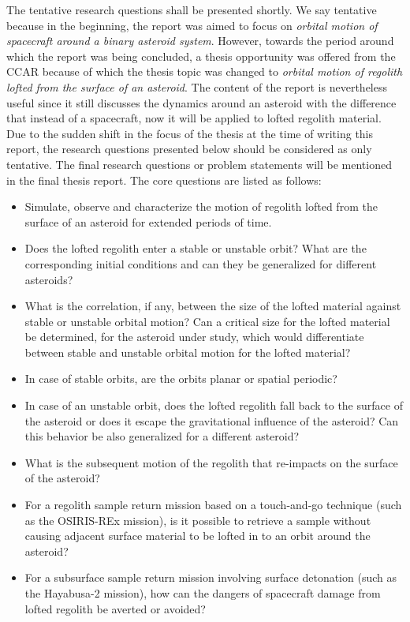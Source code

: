 The tentative research questions shall be presented shortly. We say tentative because in the beginning, the report was aimed to focus on \textit{orbital motion of spacecraft around a binary asteroid system}. However, towards the period around which the report was being concluded, a thesis opportunity was offered from the \gls{CCAR} because of which the thesis topic was changed to \textit{orbital motion of regolith lofted from the surface of an asteroid}. The content of the report is nevertheless useful since it still discusses the dynamics around an asteroid with the difference that instead of a spacecraft, now it will be applied to lofted regolith material. Due to the sudden shift in the focus of the thesis at the time of writing this report, the research questions presented below should be considered as only tentative. The final research questions or problem statements will be mentioned in the final thesis report. The core questions are listed as follows:
\begin{itemize}
\item Simulate, observe and characterize the motion of regolith lofted from the surface of an asteroid for extended periods of time.
\item Does the lofted regolith enter a stable or unstable orbit? What are the corresponding initial conditions and can they be generalized for different asteroids?
\item What is the correlation, if any, between the size of the lofted material against stable or unstable orbital motion? Can a critical size for the lofted material be determined, for the asteroid under study, which would differentiate between stable and unstable orbital motion for the lofted material?
\item In case of stable orbits, are the orbits planar or spatial periodic?
\item In case of an unstable orbit, does the lofted regolith fall back to the surface of the asteroid or does it escape the gravitational influence of the asteroid? Can this behavior be also generalized for a different asteroid?
\item What is the subsequent motion of the regolith that re-impacts on the surface of the asteroid?
\item For a regolith sample return mission based on a touch-and-go technique (such as the \gls{OSIRIS-REx} mission), is it possible to retrieve a sample without causing adjacent surface material to be lofted in to an orbit around the asteroid?
\item For a subsurface sample return mission involving surface detonation (such as the Hayabusa-2 mission), how can the dangers of spacecraft damage from lofted regolith be averted or avoided?
\end{itemize}

